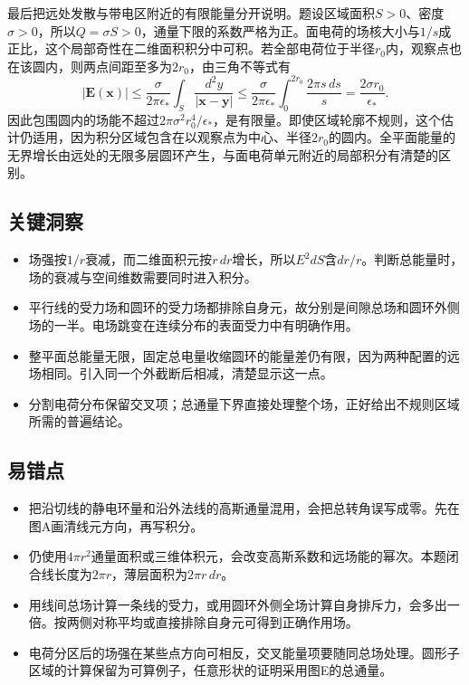 \documentclass[UTF8,fontset=fandol,a4paper,11pt]{ctexart}
\begin{document}
最后把远处发散与带电区附近的有限能量分开说明。题设区域面积$S>0$、密度$\sigma>0$，所以$Q=\sigma S>0$，通量下限的系数严格为正。面电荷的场核大小与$1/s$成正比，这个局部奇性在二维面积积分中可积。若全部电荷位于半径$r_0$内，观察点也在该圆内，则两点间距至多为$2r_0$，由三角不等式有
\[
|\boldsymbol E(\boldsymbol x)|
\le\frac{\sigma}{2\pi\epsilon_*}
\int_S\frac{d^2y}{|\boldsymbol x-\boldsymbol y|}
\le\frac{\sigma}{2\pi\epsilon_*}
\int_0^{2r_0}\frac{2\pi s\,ds}{s}
=\frac{2\sigma r_0}{\epsilon_*}.
\]
因此包围圆内的场能不超过$2\pi\sigma^2r_0^4/\epsilon_*$，是有限量。即使区域轮廓不规则，这个估计仍适用，因为积分区域包含在以观察点为中心、半径$2r_0$的圆内。全平面能量的无界增长由远处的无限多层圆环产生，与面电荷单元附近的局部积分有清楚的区别。




\subsection*{关键洞察}

\begin{itemize}
\item 场强按$1/r$衰减，而二维面积元按$r\,dr$增长，所以$E^2dS$含$dr/r$。判断总能量时，场的衰减与空间维数需要同时进入积分。
\item 平行线的受力场和圆环的受力场都排除自身元，故分别是间隙总场和圆环外侧场的一半。电场跳变在连续分布的表面受力中有明确作用。
\item 整平面总能量无限，固定总电量收缩圆环的能量差仍有限，因为两种配置的远场相同。引入同一个外截断后相减，清楚显示这一点。
\item 分割电荷分布保留交叉项；总通量下界直接处理整个场，正好给出不规则区域所需的普遍结论。
\end{itemize}



\subsection*{易错点}

\begin{itemize}
\item 把沿切线的静电环量和沿外法线的高斯通量混用，会把总转角误写成零。先在图A画清线元方向，再写积分。
\item 仍使用$4\pi r^2$通量面积或三维体积元，会改变高斯系数和远场能的幂次。本题闭合线长度为$2\pi r$，薄层面积为$2\pi r\,dr$。
\item 用线间总场计算一条线的受力，或用圆环外侧全场计算自身排斥力，会多出一倍。按两侧对称平均或直接排除自身元可得到正确作用场。
\item 电荷分区后的场强在某些点方向可相反，交叉能量项要随同总场处理。圆形子区域的计算保留为可算例子，任意形状的证明采用图E的总通量。
\end{itemize}
\end{document}
